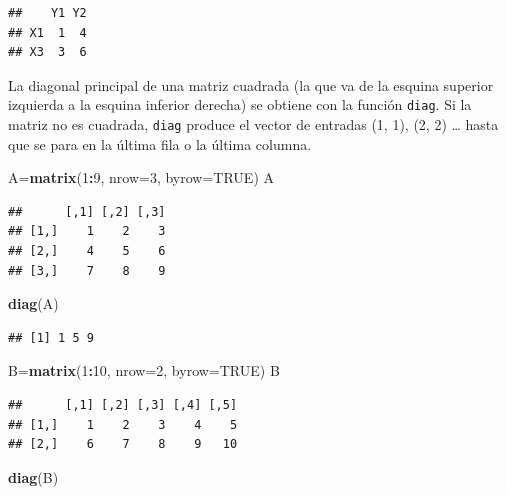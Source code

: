 \documentclass[]{book}
\newenvironment{Shaded}{\begin{snugshade}}{\end{snugshade}}
\newcommand{\DataTypeTok}[1]{\textcolor[rgb]{0.13,0.29,0.53}{#1}}
\newcommand{\DecValTok}[1]{\textcolor[rgb]{0.00,0.00,0.81}{#1}}
\newcommand{\KeywordTok}[1]{\textcolor[rgb]{0.13,0.29,0.53}{\textbf{#1}}}
\newcommand{\NormalTok}[1]{#1}
\newcommand{\OperatorTok}[1]{\textcolor[rgb]{0.81,0.36,0.00}{\textbf{#1}}}
\newcommand{\OtherTok}[1]{\textcolor[rgb]{0.56,0.35,0.01}{#1}}
\theoremstyle{definition}
\theoremstyle{definition}
\theoremstyle{definition}
\theoremstyle{remark}
\begin{document}
\begin{verbatim}
##    Y1 Y2
## X1  1  4
## X3  3  6
\end{verbatim}

La diagonal principal de una matriz cuadrada (la que va de la esquina superior izquierda a la esquina inferior derecha) se obtiene con la función \texttt{diag}. Si la matriz no es cuadrada, \texttt{diag} produce el vector de entradas (1, 1), (2, 2) \ldots{} hasta que se para en la última fila o la última columna.

\begin{Shaded}
\begin{Highlighting}[]
\NormalTok{A=}\KeywordTok{matrix}\NormalTok{(}\DecValTok{1}\OperatorTok{:}\DecValTok{9}\NormalTok{, }\DataTypeTok{nrow=}\DecValTok{3}\NormalTok{, }\DataTypeTok{byrow=}\OtherTok{TRUE}\NormalTok{)}
\NormalTok{A }
\end{Highlighting}
\end{Shaded}

\begin{verbatim}
##      [,1] [,2] [,3]
## [1,]    1    2    3
## [2,]    4    5    6
## [3,]    7    8    9
\end{verbatim}

\begin{Shaded}
\begin{Highlighting}[]
\KeywordTok{diag}\NormalTok{(A)}
\end{Highlighting}
\end{Shaded}

\begin{verbatim}
## [1] 1 5 9
\end{verbatim}

\begin{Shaded}
\begin{Highlighting}[]
\NormalTok{B=}\KeywordTok{matrix}\NormalTok{(}\DecValTok{1}\OperatorTok{:}\DecValTok{10}\NormalTok{, }\DataTypeTok{nrow=}\DecValTok{2}\NormalTok{, }\DataTypeTok{byrow=}\OtherTok{TRUE}\NormalTok{)}
\NormalTok{B}
\end{Highlighting}
\end{Shaded}

\begin{verbatim}
##      [,1] [,2] [,3] [,4] [,5]
## [1,]    1    2    3    4    5
## [2,]    6    7    8    9   10
\end{verbatim}

\begin{Shaded}
\begin{Highlighting}[]
\KeywordTok{diag}\NormalTok{(B)}
\end{Highlighting}
\end{Shaded}
\end{document}
